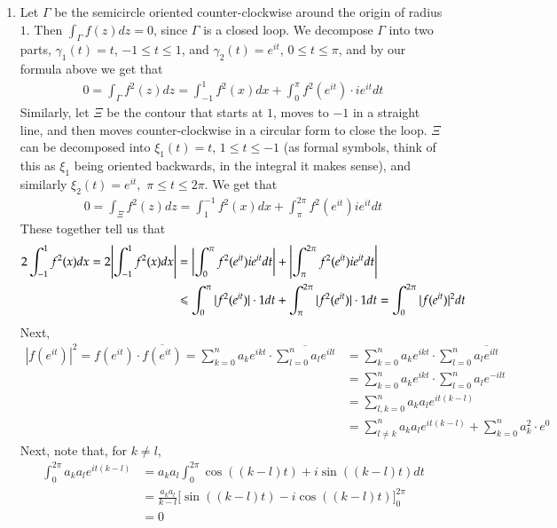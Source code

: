 \documentclass[12pt]{article}
\theoremstyle{definition}
\theoremstyle{remark}
\renewcommand{\leq}{\leqslant}
\begin{document}
\begin{enumerate}[leftmargin=\labelsep]
		\item Let $\Gamma$ be the semicircle oriented counter-clockwise around the origin of radius $1$. Then $\int_\Gamma f(z)dz = 0$, since $\Gamma$ is a closed loop. We decompose $\Gamma$ into two parts, $\gamma_1(t) = t$, $-1 \leq t \leq 1$, and $\gamma_2(t) = e^{it}$, $0 \leq t \leq \pi$, and by our formula above we get that 
		\begin{align*}
			0 = \int_\Gamma f^2(z)dz = \int_{-1}^1 f^2(x)dx + \int_0^{\pi} f^2(e^{it}) \cdot ie^{it}dt
		\end{align*}
		Similarly, let $\Xi$ be the contour that starts at $1$, moves to $-1$ in a straight line, and then moves counter-clockwise in a circular form to close the loop. $\Xi$ can be decomposed into $\xi_1(t) = t$, $1 \leq t \leq -1$ (as formal symbols, think of this as $\xi_1$ being oriented backwards, in the integral it makes sense), and similarly $\xi_2(t) = e^{it},$ $\pi \leq t \leq 2\pi$. We get that
		\begin{align*}
			0 = \int_\Xi f^2(z)dz = \int_1^{-1} f^2(x)dx + \int_\pi^{2\pi} f^2(e^{it})ie^{it}dt
		\end{align*}
		These together tell us that 
		\begin{align*}
			2\int_{-1}^1 f^2(x)dx = 2\qty|\int_{-1}^1 f^2(x)dx| &= \qty|\int_0^\pi f^2(e^{it})ie^{it}dt| + \qty|\int_\pi^{2\pi} f^2(e^{it})ie^{it}dt| \\
			&\leq \int_0^\pi |f^2(e^{it})| \cdot 1dt + \int_\pi^{2\pi} |f^2(e^{it})| \cdot 1dt = \int_0^{2\pi} |f(e^{it})|^2dt
		\end{align*}
		Next, 
		\begin{align*}
			|f(e^{it})|^2 = f(e^{it}) \cdot \overline{f(e^{it})} = \sum_{k=0}^{n} a_ke^{ikt} \cdot \overline{\sum_{l = 0}^n a_le^{ilt}} &= \sum_{k=0}^{n} a_ke^{ikt} \cdot \sum_{l = 0}^n \overline{a_le^{ilt}} \\
			&= \sum_{k=0}^{n} a_ke^{ikt} \cdot \sum_{l = 0}^n a_le^{-ilt} \\
			&= \sum_{l, k = 0}^n a_ka_le^{it(k-l)} \\
			&= \sum_{l \neq k}^n a_ka_le^{it(k-l)} + \sum_{k=0}^n a_k^2 \cdot e^0
		\end{align*}
		Next, note that, for $k \neq l$,
		\begin{align*}
			\int_0^{2\pi} a_ka_le^{it(k-l)} &= a_ka_l\int_0^{2\pi} \cos((k-l)t) + i\sin((k-l)t)dt \\
			&=\frac{a_ka_l}{k-l} \big[\sin((k-l)t) - i\cos((k-l)t)\big]_0^{2\pi} \\
			&= 0
		\end{align*}

\end{enumerate}
\end{document}
